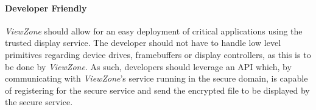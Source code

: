 \paragraph{\textbf{Developer Friendly}}

\emph{ViewZone} should allow for an easy deployment of critical applications using the trusted display service. The developer should not have to handle low level primitives regarding device drives, framebuffers or display controllers, as this is to be done by \emph{ViewZone}. As such, developers should leverage an API which, by communicating with \emph{ViewZone}'s service running in the secure domain, is capable of registering for the secure service and send the encrypted file to be displayed by the secure service.
